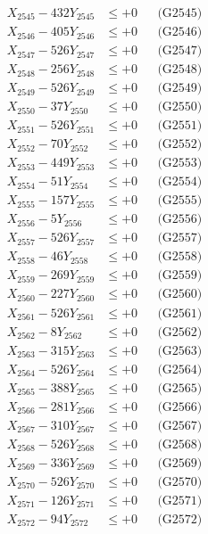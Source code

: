 \documentclass[a4paper,10pt]{article}
\begin{document}
{\begin{align}
X_{2545} - 432Y_{2545} &\leq +0 && \text{(G2545)} \\
X_{2546} - 405Y_{2546} &\leq +0 && \text{(G2546)} \\
X_{2547} - 526Y_{2547} &\leq +0 && \text{(G2547)} \\
X_{2548} - 256Y_{2548} &\leq +0 && \text{(G2548)} \\
X_{2549} - 526Y_{2549} &\leq +0 && \text{(G2549)} \\
X_{2550} - 37Y_{2550} &\leq +0 && \text{(G2550)} \\
\allowbreak
X_{2551} - 526Y_{2551} &\leq +0 && \text{(G2551)} \\
X_{2552} - 70Y_{2552} &\leq +0 && \text{(G2552)} \\
X_{2553} - 449Y_{2553} &\leq +0 && \text{(G2553)} \\
X_{2554} - 51Y_{2554} &\leq +0 && \text{(G2554)} \\
X_{2555} - 157Y_{2555} &\leq +0 && \text{(G2555)} \\
X_{2556} - 5Y_{2556} &\leq +0 && \text{(G2556)} \\
X_{2557} - 526Y_{2557} &\leq +0 && \text{(G2557)} \\
X_{2558} - 46Y_{2558} &\leq +0 && \text{(G2558)} \\
X_{2559} - 269Y_{2559} &\leq +0 && \text{(G2559)} \\
X_{2560} - 227Y_{2560} &\leq +0 && \text{(G2560)} \\
\allowbreak
X_{2561} - 526Y_{2561} &\leq +0 && \text{(G2561)} \\
X_{2562} - 8Y_{2562} &\leq +0 && \text{(G2562)} \\
X_{2563} - 315Y_{2563} &\leq +0 && \text{(G2563)} \\
X_{2564} - 526Y_{2564} &\leq +0 && \text{(G2564)} \\
X_{2565} - 388Y_{2565} &\leq +0 && \text{(G2565)} \\
X_{2566} - 281Y_{2566} &\leq +0 && \text{(G2566)} \\
X_{2567} - 310Y_{2567} &\leq +0 && \text{(G2567)} \\
X_{2568} - 526Y_{2568} &\leq +0 && \text{(G2568)} \\
X_{2569} - 336Y_{2569} &\leq +0 && \text{(G2569)} \\
X_{2570} - 526Y_{2570} &\leq +0 && \text{(G2570)} \\
\allowbreak
X_{2571} - 126Y_{2571} &\leq +0 && \text{(G2571)} \\
X_{2572} - 94Y_{2572} &\leq +0 && \text{(G2572)} \\

\end{align}}
\end{document}
